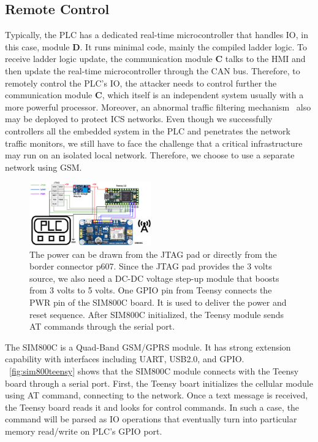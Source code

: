 \subsection{Remote Control}

Typically, the PLC has a dedicated real-time microcontroller
that handles IO, in this case, module \textbf{D}. It runs minimal code, mainly the compiled ladder logic.  To receive ladder logic update, the communication module \textbf{C} talks to the HMI and then update the real-time microcontroller through the CAN bus. Therefore, to remotely control the PLC's IO, the attacker needs to control further the communication module \textbf{C}, which itself is an independent system usually with a more powerful processor. Moreover, an abnormal traffic filtering mechanism~\cite{kim2016abnormal} also may be deployed to protect ICS networks. Even though we successfully controllers all the embedded system in the PLC and penetrates the network traffic monitors, we still have to face the challenge that a critical infrastructure may run on an isolated local network. Therefore, we choose to use a separate network using GSM.

\begin{figure}[th]
	\includegraphics[width=0.47\textwidth]{figures/sim800teensy}
	\centering
	\caption{The power can be drawn from the JTAG pad or directly from the border connector p607. Since the JTAG pad provides the 3 volts source, we also need a DC-DC voltage step-up module that boosts from 3 volts to 5 volts. One GPIO pin from Teensy connects the PWR pin of the SIM800C board. It is used to deliver the power and reset sequence. After SIM800C initialized, the Teensy module sends AT commands through the serial port.}
	\label{fig:sim800teensy}
\end{figure}

The SIM800C is a Quad-Band GSM/GPRS module. It has strong extension capability with interfaces including UART, USB2.0, and GPIO. ~\autoref{fig:sim800teensy} shows that the SIM800C module connects with the Teensy board through a serial port. First, the Teensy boart initializes the cellular module using AT command, connecting to the network. Once a text message is received, the Teensy board reads it and looks for control commands. In such a case,  the command will be parsed as IO operations that eventually turn into particular memory read/write on PLC's GPIO port.
